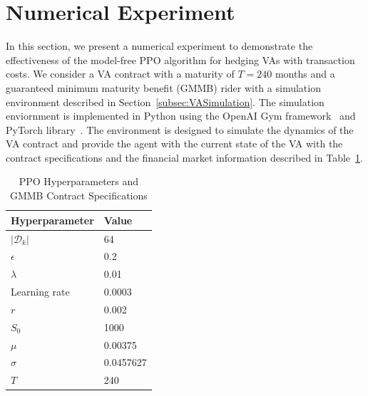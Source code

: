 \section{Numerical Experiment}

In this section, we present a numerical experiment to demonstrate the effectiveness of the model-free PPO algorithm for hedging VAs with transaction costs.
We consider a VA contract with a maturity of $T=240$ months and a guaranteed minimum maturity benefit (GMMB) rider with a simulation environment described in Section~\ref{subsec:VASimulation}.
The simulation enviornment is implemented in Python using the OpenAI Gym framework~\citep{brockman2016openai} and PyTorch library~\citep{paszke2019pytorch}.
The environment is designed to simulate the dynamics of the VA contract and provide the agent with the current state of the VA with the contract specifications and the financial market information described in Table~\ref{tab3:hyperparameters}.

\begin{table}[ht!]
    \centering
    \begin{tabular}{ll} 
        \toprule
        Hyperparameter & Value \\
        \midrule
        $|\mathcal{D}_k|$   & 64        \\
        $\epsilon$          & 0.2       \\
        $\lambda$           & 0.01      \\
        Learning rate       & 0.0003    \\
        $r$                 & 0.002     \\
        $S_0$               & 1000      \\
        $\mu$               & 0.00375   \\
        $\sigma$            & 0.0457627 \\
        $T$                 & 240       \\
        \bottomrule
    \end{tabular}
    \caption{PPO Hyperparameters and GMMB Contract Specifications} 
    \label{tab3:hyperparameters}
\end{table}

